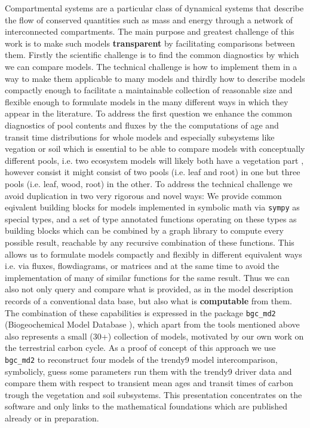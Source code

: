 
Compartmental systems are a particular class of dynamical systems that describe
the flow of conserved quantities such as mass and energy through a network of
interconnected compartments.  The main purpose and greatest challenge of this
work is to make such models {\bf transparent} by  facilitating  comparisons
between them.  Firstly the scientific challenge is to find the common
diagnostics by which we can compare models. The technical challenge is how to
implement them in a way to make them applicable to many models and thirdly how
to describe models compactly enough to facilitate a maintainable collection of
reasonable size and flexible enough to formulate models in the many different
ways in which they appear in the literature.  To address the first question we
enhance the common diagnostics of pool contents and fluxes by the the
computations of age and transit time distributions for whole models and
especially subsystems like vegation or soil which is essential to be able to
compare models with conceptually different pools, i.e. two ecosystem models
will likely both have a vegetation part , however consist it might consist of two pools
(i.e. leaf and root) in one but three pools (i.e. leaf, wood, root) in the
other.  
To address the technical challenge we avoid duplication in two very
rigorous and novel ways: We provide common eqivalent building blocks for models
implemented in symbolic math via \texttt{sympy} as special types, and a set of
type annotated functions operating on these types as building blocks which can
be combined by a graph library to compute every possible result,
reachable by any recursive combination of these functions. 
This allows us to formulate models compactly and
flexibly in different equivalent ways i.e. via fluxes, flowdiagrams, or
matrices and at the same time to avoid the implementation of many of similar
functions for the same result.  Thus we can also not only query and compare
what is provided, as in the model description records of a conventional data
base, but also what is {\bf computable} from them.  The combination of these
capabilities is expressed in the package \texttt{bgc\_md2} (Biogeochemical
Model Database ), which apart from the tools mentioned above also represents a small
(30+) collection of models, motivated by our own work on the terrestrial carbon
cycle.
As a proof of concept of this approach we use \texttt{bgc\_md2} to reconstruct
four models of the trendy9 model intercomparison, symbolicly, guess some parameters
run them with the trendy9 driver data and compare them with respect to transient 
mean ages and transit times of carbon trough the vegetation and soil subsystems.
This presentation concentrates on the software and only links to the mathematical foundations
which are published already or in preparation.

